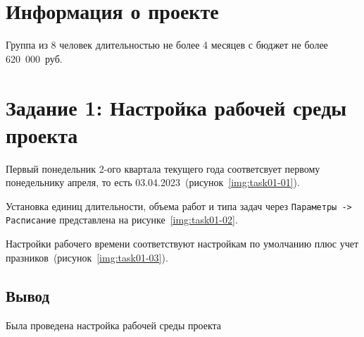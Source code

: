 \section{Информация о проекте}

Группа из 8 человек длительностью не более 4 месяцев с бюджет не более 620~000~руб.

\section{Задание 1: Настройка рабочей среды проекта}

Первый понедельник 2-ого квартала текущего года соответсвует первому
понедельнику апреля, то есть 03.04.2023~(рисунок~\ref{img:task01-01}).


Установка единиц длительности, объема работ и типа задач через
\texttt{Параметры -> Расписание} представлена на рисунке~\ref{img:task01-02}.


Настройки рабочего времени соответствуют настройкам по умолчанию плюс учет
празников~(рисунок~\ref{img:task01-03}).


\subsection*{Вывод}

Была проведена настройка рабочей среды проекта

